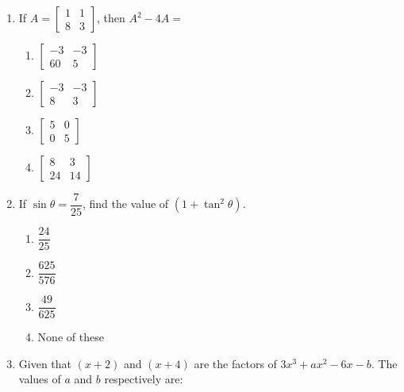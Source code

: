 \begin{enumerate}[label=(\roman*)]
    \item If $A = \begin{bmatrix*} 1 & 1 \\ 8 & 3 \end{bmatrix*}$, then 
        $A^2 - 4A =$

        \begin{multicols}{2}
        \begin{enumerate}[label=(\alph*)]
            \item $\begin{bmatrix*} -3 & -3 \\ 60 &  5 \end{bmatrix*}$ 
            \item $\begin{bmatrix*} -3 & -3 \\  8 &  3 \end{bmatrix*}$ 
            \item $\begin{bmatrix*}  5 &  0 \\  0 &  5 \end{bmatrix*}$ 
            \item $\begin{bmatrix*}  8 &  3 \\ 24 & 14 \end{bmatrix*}$ 
        \end{enumerate}
        \end{multicols}

    \item If $\sin \theta = \dfrac{7}{25}$, find the value of $(1 + \tan^2 \theta)$. 

        \begin{multicols}{2}
        \begin{enumerate}[label=(\alph*)]
            \item $\dfrac{24}{25}$ 
            \item $\dfrac{625}{576}$ 
            \item $\dfrac{49}{625}$ 
            \item None of these 
        \end{enumerate}
        \end{multicols}

    \item Given that $(x+2)$ and $(x+4)$ are the factors of 
        $3x^3 + ax^2 - 6x -b$. The values of $a$ and $b$ respectively
        are:


\end{enumerate}
